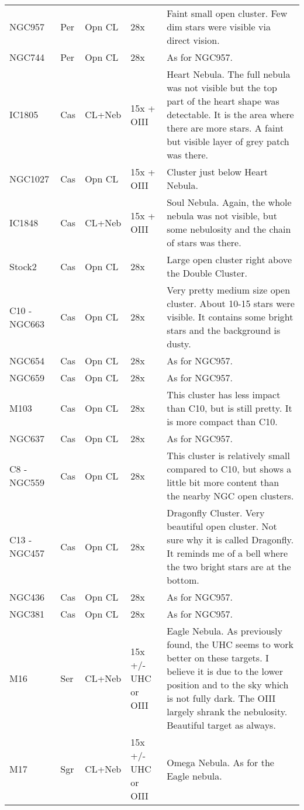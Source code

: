 \begin{longtable}{ p{0.7in}  p{0.3in}  p{0.6in}  p{0.9in}  p{5.8in} }
NGC957 & Per & Opn CL & 28x & Faint small open cluster. Few dim stars were visible via direct vision. \\ 
NGC744 & Per & Opn CL & 28x & As for NGC957. \\ 
IC1805 & Cas & CL+Neb & 15x + OIII & Heart Nebula. The full nebula was not visible but the top part of the heart shape was detectable. It is the area where there are more stars. A faint but visible layer of grey patch was there.  \\ 
NGC1027 & Cas & Opn CL & 15x + OIII & Cluster just below Heart Nebula. \\ 
IC1848 & Cas & CL+Neb & 15x + OIII & Soul Nebula. Again, the whole nebula was not visible, but some nebulosity and the chain of stars was there. \\ 
Stock2 & Cas & Opn CL & 28x & Large open cluster right above the Double Cluster.  \\ 
C10 - NGC663 & Cas & Opn CL & 28x & Very pretty medium size open cluster. About 10-15 stars were visible. It contains some bright stars and the background is dusty. \\ 
NGC654 & Cas & Opn CL & 28x & As for NGC957. \\ 
NGC659 & Cas & Opn CL & 28x & As for NGC957. \\ 
M103 & Cas & Opn CL & 28x & This cluster has less impact than C10, but is still pretty. It is more compact than C10. \\ 
NGC637 & Cas & Opn CL & 28x & As for NGC957. \\ 
C8 - NGC559 & Cas & Opn CL & 28x & This cluster is relatively small compared to C10, but shows a little bit more content than the nearby NGC open clusters. \\ 
C13 - NGC457 & Cas & Opn CL & 28x & Dragonfly Cluster. Very beautiful open cluster. Not sure why it is called Dragonfly. It reminds me of a bell where the two bright stars are at the bottom. \\ 
NGC436 & Cas & Opn CL & 28x & As for NGC957. \\ 
NGC381 & Cas & Opn CL & 28x & As for NGC957. \\ 
M16 & Ser & CL+Neb & 15x +/- UHC or OIII & Eagle Nebula. As previously found, the UHC seems to work better on these targets. I believe it is due to the lower position and to the sky which is not fully dark. The OIII largely shrank the nebulosity. Beautiful target as always. \\ 
M17 & Sgr & CL+Neb & 15x +/- UHC or OIII & Omega Nebula. As for the Eagle nebula. \\ 

\end{longtable}
